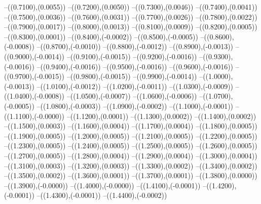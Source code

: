 {	--({\sx*(0.7100)},{\sy*(0.0055)})
	--({\sx*(0.7200)},{\sy*(0.0050)})
	--({\sx*(0.7300)},{\sy*(0.0046)})
	--({\sx*(0.7400)},{\sy*(0.0041)})
	--({\sx*(0.7500)},{\sy*(0.0036)})
	--({\sx*(0.7600)},{\sy*(0.0031)})
	--({\sx*(0.7700)},{\sy*(0.0026)})
	--({\sx*(0.7800)},{\sy*(0.0022)})
	--({\sx*(0.7900)},{\sy*(0.0017)})
	--({\sx*(0.8000)},{\sy*(0.0013)})
	--({\sx*(0.8100)},{\sy*(0.0009)})
	--({\sx*(0.8200)},{\sy*(0.0005)})
	--({\sx*(0.8300)},{\sy*(0.0001)})
	--({\sx*(0.8400)},{\sy*(-0.0002)})
	--({\sx*(0.8500)},{\sy*(-0.0005)})
	--({\sx*(0.8600)},{\sy*(-0.0008)})
	--({\sx*(0.8700)},{\sy*(-0.0010)})
	--({\sx*(0.8800)},{\sy*(-0.0012)})
	--({\sx*(0.8900)},{\sy*(-0.0013)})
	--({\sx*(0.9000)},{\sy*(-0.0014)})
	--({\sx*(0.9100)},{\sy*(-0.0015)})
	--({\sx*(0.9200)},{\sy*(-0.0016)})
	--({\sx*(0.9300)},{\sy*(-0.0016)})
	--({\sx*(0.9400)},{\sy*(-0.0016)})
	--({\sx*(0.9500)},{\sy*(-0.0016)})
	--({\sx*(0.9600)},{\sy*(-0.0016)})
	--({\sx*(0.9700)},{\sy*(-0.0015)})
	--({\sx*(0.9800)},{\sy*(-0.0015)})
	--({\sx*(0.9900)},{\sy*(-0.0014)})
	--({\sx*(1.0000)},{\sy*(-0.0013)})
	--({\sx*(1.0100)},{\sy*(-0.0012)})
	--({\sx*(1.0200)},{\sy*(-0.0011)})
	--({\sx*(1.0300)},{\sy*(-0.0009)})
	--({\sx*(1.0400)},{\sy*(-0.0008)})
	--({\sx*(1.0500)},{\sy*(-0.0007)})
	--({\sx*(1.0600)},{\sy*(-0.0006)})
	--({\sx*(1.0700)},{\sy*(-0.0005)})
	--({\sx*(1.0800)},{\sy*(-0.0003)})
	--({\sx*(1.0900)},{\sy*(-0.0002)})
	--({\sx*(1.1000)},{\sy*(-0.0001)})
	--({\sx*(1.1100)},{\sy*(-0.0000)})
	--({\sx*(1.1200)},{\sy*(0.0001)})
	--({\sx*(1.1300)},{\sy*(0.0002)})
	--({\sx*(1.1400)},{\sy*(0.0002)})
	--({\sx*(1.1500)},{\sy*(0.0003)})
	--({\sx*(1.1600)},{\sy*(0.0004)})
	--({\sx*(1.1700)},{\sy*(0.0004)})
	--({\sx*(1.1800)},{\sy*(0.0005)})
	--({\sx*(1.1900)},{\sy*(0.0005)})
	--({\sx*(1.2000)},{\sy*(0.0005)})
	--({\sx*(1.2100)},{\sy*(0.0005)})
	--({\sx*(1.2200)},{\sy*(0.0005)})
	--({\sx*(1.2300)},{\sy*(0.0005)})
	--({\sx*(1.2400)},{\sy*(0.0005)})
	--({\sx*(1.2500)},{\sy*(0.0005)})
	--({\sx*(1.2600)},{\sy*(0.0005)})
	--({\sx*(1.2700)},{\sy*(0.0005)})
	--({\sx*(1.2800)},{\sy*(0.0004)})
	--({\sx*(1.2900)},{\sy*(0.0004)})
	--({\sx*(1.3000)},{\sy*(0.0004)})
	--({\sx*(1.3100)},{\sy*(0.0003)})
	--({\sx*(1.3200)},{\sy*(0.0003)})
	--({\sx*(1.3300)},{\sy*(0.0002)})
	--({\sx*(1.3400)},{\sy*(0.0002)})
	--({\sx*(1.3500)},{\sy*(0.0002)})
	--({\sx*(1.3600)},{\sy*(0.0001)})
	--({\sx*(1.3700)},{\sy*(0.0001)})
	--({\sx*(1.3800)},{\sy*(0.0000)})
	--({\sx*(1.3900)},{\sy*(-0.0000)})
	--({\sx*(1.4000)},{\sy*(-0.0000)})
	--({\sx*(1.4100)},{\sy*(-0.0001)})
	--({\sx*(1.4200)},{\sy*(-0.0001)})
	--({\sx*(1.4300)},{\sy*(-0.0001)})
	--({\sx*(1.4400)},{\sy*(-0.0002)})
}
